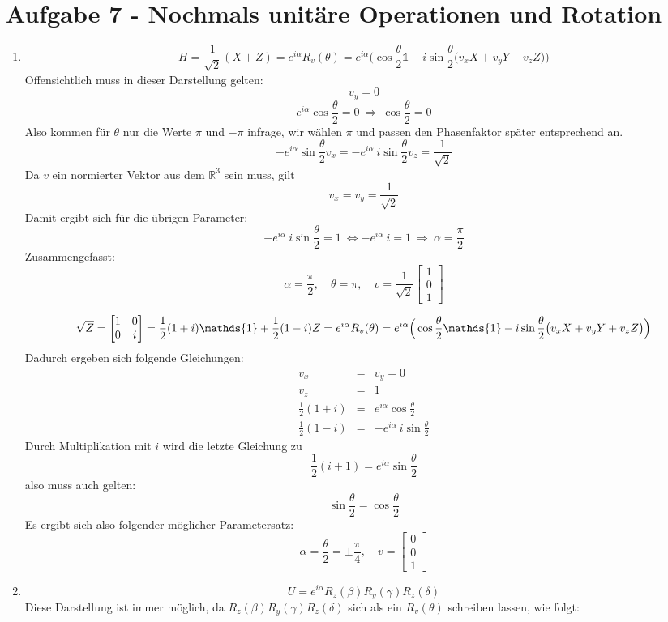 \section*{Aufgabe 7 - Nochmals unitäre Operationen und Rotation}
\begin{enumerate}
\item
        \[ H = \frac{1}{\sqrt{2}}(X + Z) = e^{i\alpha} R_v(\theta) = e^{i\alpha}\Big(\cos\frac{\theta}{2} \mathds{1} - i \sin\frac{\theta}{2} \big(v_x X + v_y Y + v_z Z\big)\Big) \]
        Offensichtlich muss in dieser Darstellung gelten:
        \[ v_y = 0 \]
        \[ e^{i\alpha} \cos\frac{\theta}{2} = 0\ \Rightarrow\ \cos\frac{\theta}{2} = 0 \]
        Also kommen für $\theta$ nur die Werte $\pi$ und $-\pi$ infrage, wir wählen $\pi$ und passen den Phasenfaktor später entsprechend an.
        \[ - e^{i\alpha} \sin\frac{\theta}{2} v_x = - e^{i\alpha}\ i \sin\frac{\theta}{2} v_z = \frac{1}{\sqrt{2}} \]
        Da $v$ ein normierter Vektor aus dem $\mathds{R}^3$ sein muss, gilt
        \[ v_x = v_y = \frac{1}{\sqrt{2}} \]
        Damit ergibt sich für die übrigen Parameter:
        \[ - e^{i\alpha}\ i \sin\frac{\theta}{2} = 1\ \Leftrightarrow - e^{i\alpha}\ i = 1\ \Rightarrow\ \alpha = \frac{\pi}{2} \]
        Zusammengefasst:
        \[ \alpha = \frac{\pi}{2}, \quad \theta = \pi, \quad v = \frac{1}{\sqrt{2}} \begin{bmatrix}1\\0\\1\end{bmatrix} \]

        \[ \sqrt{Z} = \vtwo{1&0}{0&i} = \frac{1}{2}(1+i)\mathds{1} + \frac{1}{2}(1-i)Z = e^{i\alpha} R_v(\theta) = e^{i\alpha}\Big(\cos\frac{\theta}{2} \mathds{1} - i \sin\frac{\theta}{2} \big(v_x X + v_y Y + v_z Z\big)\Big) \]
        Dadurch ergeben sich folgende Gleichungen:
        \begin{eqnarray*}
        v_x &=& v_y = 0 \\
        v_z &=& 1 \\
        \frac{1}{2}(1+i) &=& e^{i\alpha} \cos\frac{\theta}{2} \\
        \frac{1}{2}(1-i) &=& - e^{i\alpha}\ i \sin\frac{\theta}{2}
        \end{eqnarray*}
        Durch Multiplikation mit $i$ wird die letzte Gleichung zu
        \[ \frac{1}{2}(i+1) = e^{i\alpha} \sin\frac{\theta}{2} \]
        also muss auch gelten:
        \[ \sin\frac{\theta}{2} = \cos\frac{\theta}{2} \]
        Es ergibt sich also folgender möglicher Parametersatz:
        \[ \alpha = \frac{\theta}{2} = \pm \frac{\pi}{4}, \quad v = \begin{bmatrix}0\\0\\1\end{bmatrix} \]

\item
        \[ U = e^{i\alpha} R_z(\beta)R_y(\gamma)R_z(\delta) \]
        Diese Darstellung ist immer möglich, da $R_z(\beta)R_y(\gamma)R_z(\delta)$ sich als ein $R_v(\theta)$ schreiben lassen, wie folgt:
\end{enumerate}
